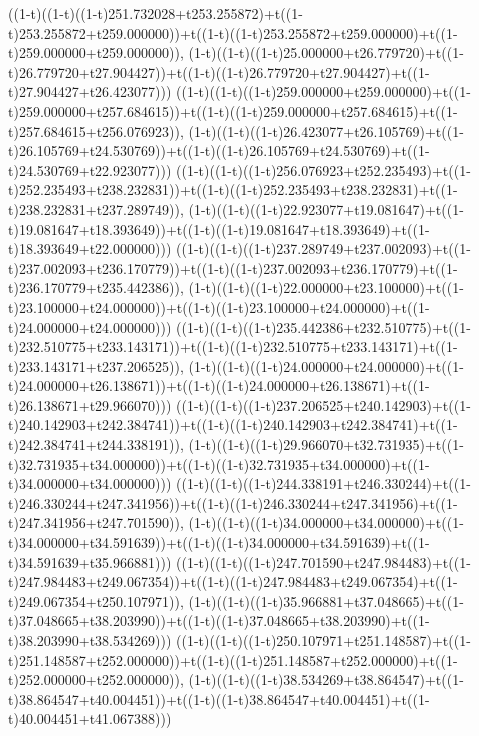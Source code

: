 ((1-t)((1-t)((1-t)251.732028+t253.255872)+t((1-t)253.255872+t259.000000))+t((1-t)((1-t)253.255872+t259.000000)+t((1-t)259.000000+t259.000000)),                                     (1-t)((1-t)((1-t)25.000000+t26.779720)+t((1-t)26.779720+t27.904427))+t((1-t)((1-t)26.779720+t27.904427)+t((1-t)27.904427+t26.423077)))
((1-t)((1-t)((1-t)259.000000+t259.000000)+t((1-t)259.000000+t257.684615))+t((1-t)((1-t)259.000000+t257.684615)+t((1-t)257.684615+t256.076923)),                                     (1-t)((1-t)((1-t)26.423077+t26.105769)+t((1-t)26.105769+t24.530769))+t((1-t)((1-t)26.105769+t24.530769)+t((1-t)24.530769+t22.923077)))
((1-t)((1-t)((1-t)256.076923+t252.235493)+t((1-t)252.235493+t238.232831))+t((1-t)((1-t)252.235493+t238.232831)+t((1-t)238.232831+t237.289749)),                                     (1-t)((1-t)((1-t)22.923077+t19.081647)+t((1-t)19.081647+t18.393649))+t((1-t)((1-t)19.081647+t18.393649)+t((1-t)18.393649+t22.000000)))
((1-t)((1-t)((1-t)237.289749+t237.002093)+t((1-t)237.002093+t236.170779))+t((1-t)((1-t)237.002093+t236.170779)+t((1-t)236.170779+t235.442386)),                                     (1-t)((1-t)((1-t)22.000000+t23.100000)+t((1-t)23.100000+t24.000000))+t((1-t)((1-t)23.100000+t24.000000)+t((1-t)24.000000+t24.000000)))
((1-t)((1-t)((1-t)235.442386+t232.510775)+t((1-t)232.510775+t233.143171))+t((1-t)((1-t)232.510775+t233.143171)+t((1-t)233.143171+t237.206525)),                                     (1-t)((1-t)((1-t)24.000000+t24.000000)+t((1-t)24.000000+t26.138671))+t((1-t)((1-t)24.000000+t26.138671)+t((1-t)26.138671+t29.966070)))
((1-t)((1-t)((1-t)237.206525+t240.142903)+t((1-t)240.142903+t242.384741))+t((1-t)((1-t)240.142903+t242.384741)+t((1-t)242.384741+t244.338191)),                                     (1-t)((1-t)((1-t)29.966070+t32.731935)+t((1-t)32.731935+t34.000000))+t((1-t)((1-t)32.731935+t34.000000)+t((1-t)34.000000+t34.000000)))
((1-t)((1-t)((1-t)244.338191+t246.330244)+t((1-t)246.330244+t247.341956))+t((1-t)((1-t)246.330244+t247.341956)+t((1-t)247.341956+t247.701590)),                                     (1-t)((1-t)((1-t)34.000000+t34.000000)+t((1-t)34.000000+t34.591639))+t((1-t)((1-t)34.000000+t34.591639)+t((1-t)34.591639+t35.966881)))
((1-t)((1-t)((1-t)247.701590+t247.984483)+t((1-t)247.984483+t249.067354))+t((1-t)((1-t)247.984483+t249.067354)+t((1-t)249.067354+t250.107971)),                                     (1-t)((1-t)((1-t)35.966881+t37.048665)+t((1-t)37.048665+t38.203990))+t((1-t)((1-t)37.048665+t38.203990)+t((1-t)38.203990+t38.534269)))
((1-t)((1-t)((1-t)250.107971+t251.148587)+t((1-t)251.148587+t252.000000))+t((1-t)((1-t)251.148587+t252.000000)+t((1-t)252.000000+t252.000000)),                                     (1-t)((1-t)((1-t)38.534269+t38.864547)+t((1-t)38.864547+t40.004451))+t((1-t)((1-t)38.864547+t40.004451)+t((1-t)40.004451+t41.067388)))
